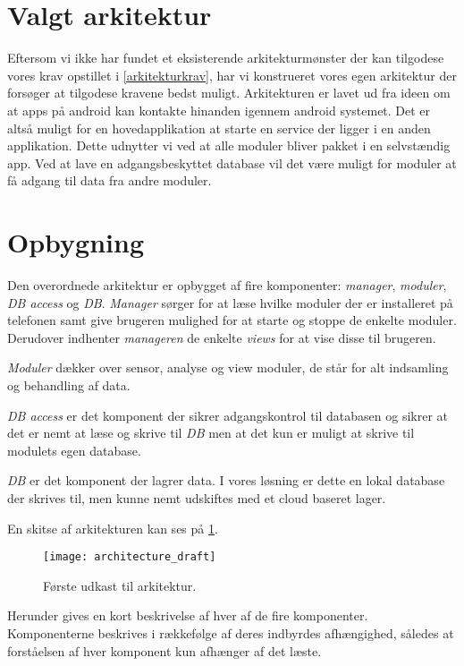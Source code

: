 \section{Valgt arkitektur}
Eftersom vi ikke har fundet et eksisterende arkitekturmønster der kan tilgodese vores krav opstillet i \cref{arkitekturkrav}, har vi konstrueret vores egen arkitektur der forsøger at tilgodese kravene bedst muligt.
Arkitekturen er lavet ud fra ideen om at apps på android kan kontakte hinanden igennem android systemet. 
Det er altså muligt for en hovedapplikation at starte en service der ligger i en anden applikation.
Dette udnytter vi ved at alle moduler bliver pakket i en selvstændig app. 
Ved at lave en adgangsbeskyttet database vil det være muligt for moduler at få adgang til data fra andre moduler.

\section*{Opbygning}
Den overordnede arkitektur er opbygget af fire komponenter: \textit{manager}, \textit{moduler}, \textit{DB access} og \textit{DB}.
\textit{Manager} sørger for at læse hvilke moduler der er installeret på telefonen samt give brugeren mulighed for at starte og stoppe de enkelte moduler.
Derudover indhenter \textit{manageren} de enkelte \textit{views} for at vise disse til brugeren.

\textit{Moduler} dækker over sensor, analyse og view moduler, de står for alt indsamling og behandling af data.

\textit{DB access} er det komponent der sikrer adgangskontrol til databasen og sikrer at det er nemt at læse og skrive til \textit{DB} men at det kun er muligt at skrive til modulets egen database.

\textit{DB} er det komponent der lagrer data. 
I vores løsning er dette en lokal database der skrives til, men kunne nemt udskiftes med et cloud baseret lager. 

En skitse af arkitekturen kan ses på \cref{arkitektur_udkast_1}.
\begin{figure}[h]
	\centering
	\texttt{[image: architecture\_draft]}
	\caption{Første udkast til arkitektur.}
  \label{arkitektur_udkast_1}
\end{figure}

Herunder gives en kort beskrivelse af hver af de fire komponenter.
Komponenterne beskrives i rækkefølge af deres indbyrdes afhængighed, således at forståelsen af hver komponent kun afhænger af det læste.

